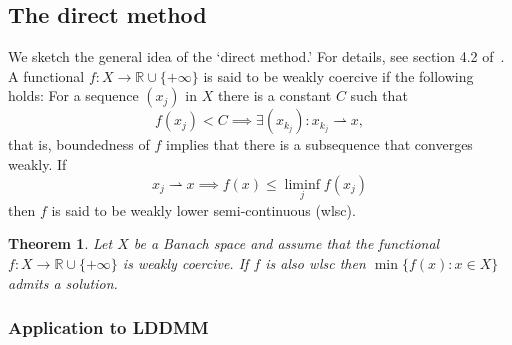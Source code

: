 \documentclass{article}
\theoremstyle{plain}
\newtheorem{teo}{Theorem}[section]
\theoremstyle{definition}
\numberwithin{equation}{section}
\newcommand{\R}{\ensuremath{\mathbb{R}}}
\begin{document}
\subsection*{The direct method}
We sketch the general idea of the `direct method.' For details, see section 4.2 of~\cite{chang2005methods}. A functional $f:X\to\R\cup\{+\infty\}$ is said to be weakly coercive if the following holds: For a sequence $(x_j)$ in $X$ there is a constant $C$ such that
\[
f(x_j)<C \implies \exists (x_{k_j}) : x_{k_j}\rightharpoonup x,
\]
that is, boundedness of $f$ implies that there is a subsequence that converges weakly. If
\[
x_j\rightharpoonup x \implies f(x)\leq \liminf_j f(x_j)
\]
then $f$ is said to be weakly lower semi-continuous (wlsc).

\begin{teo}
Let $X$ be a Banach space and assume that the functional  $f:X\to\R\cup\{+\infty\}$ is weakly coercive. If $f$ is also wlsc then $\min\{f(x):x\in X\}$ admits a solution.
\end{teo}

\subsubsection*{Application to LDDMM}
\end{document}
